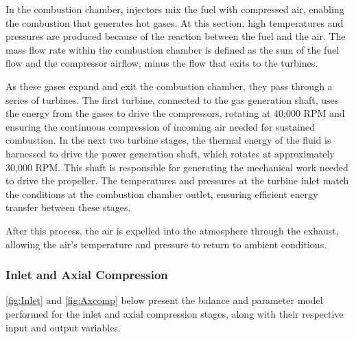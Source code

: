 \documentclass{Format}
\begin{document}
In the combustion chamber, injectors mix the fuel with compressed air, enabling the combustion that generates hot gases. At this section, high temperatures and pressures are produced because of the reaction between the fuel and the air. The mass flow rate within the combustion chamber is defined as the sum of the fuel flow and the compressor airflow, minus the flow that exits to the turbines.

As these gases expand and exit the combustion chamber, they pass through a series of turbines. The first turbine, connected to the gas generation shaft, uses the energy from the gases to drive the compressors, rotating at 40,000 RPM and ensuring the continuous compression of incoming air needed for sustained combustion. In the next two turbine stages, the thermal energy of the fluid is harnessed to drive the power generation shaft, which rotates at approximately 30,000 RPM. This shaft is responsible for generating the mechanical work needed to drive the propeller. The temperatures and pressures at the turbine inlet match the conditions at the combustion chamber outlet, ensuring efficient energy transfer between these stages.

After this process, the air is expelled into the atmosphere through the exhaust, allowing the air’s temperature and pressure to return to ambient conditions.


\subsubsection{Inlet and Axial Compression}

\autoref{fig:Inlet} and \autoref{fig:Axcomp} below present the balance and parameter model performed for the inlet and axial compression stages, along with their respective input and output variables.
\end{document}
